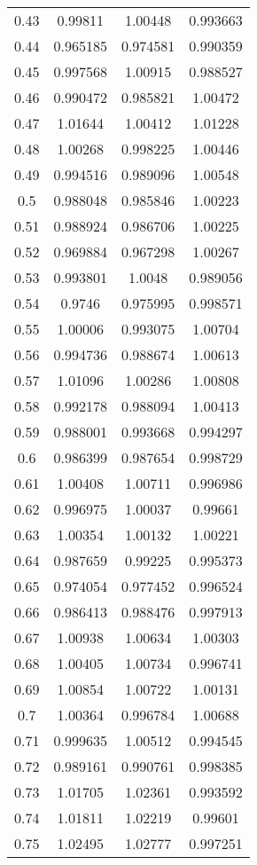 \begin{table}[h!]
\begin{tabular}{|c|c|c|c|}
0.43 & 0.99811 & 1.00448 & 0.993663 \\
0.44 & 0.965185 & 0.974581 & 0.990359 \\
0.45 & 0.997568 & 1.00915 & 0.988527 \\
0.46 & 0.990472 & 0.985821 & 1.00472 \\
0.47 & 1.01644 & 1.00412 & 1.01228 \\
0.48 & 1.00268 & 0.998225 & 1.00446 \\
0.49 & 0.994516 & 0.989096 & 1.00548 \\
0.5 & 0.988048 & 0.985846 & 1.00223 \\
0.51 & 0.988924 & 0.986706 & 1.00225 \\
0.52 & 0.969884 & 0.967298 & 1.00267 \\
0.53 & 0.993801 & 1.0048 & 0.989056 \\
0.54 & 0.9746 & 0.975995 & 0.998571 \\
0.55 & 1.00006 & 0.993075 & 1.00704 \\
0.56 & 0.994736 & 0.988674 & 1.00613 \\
0.57 & 1.01096 & 1.00286 & 1.00808 \\
0.58 & 0.992178 & 0.988094 & 1.00413 \\
0.59 & 0.988001 & 0.993668 & 0.994297 \\
0.6 & 0.986399 & 0.987654 & 0.998729 \\
0.61 & 1.00408 & 1.00711 & 0.996986 \\
0.62 & 0.996975 & 1.00037 & 0.99661 \\
0.63 & 1.00354 & 1.00132 & 1.00221 \\
0.64 & 0.987659 & 0.99225 & 0.995373 \\
0.65 & 0.974054 & 0.977452 & 0.996524 \\
0.66 & 0.986413 & 0.988476 & 0.997913 \\
0.67 & 1.00938 & 1.00634 & 1.00303 \\
0.68 & 1.00405 & 1.00734 & 0.996741 \\
0.69 & 1.00854 & 1.00722 & 1.00131 \\
0.7 & 1.00364 & 0.996784 & 1.00688 \\
0.71 & 0.999635 & 1.00512 & 0.994545 \\
0.72 & 0.989161 & 0.990761 & 0.998385 \\
0.73 & 1.01705 & 1.02361 & 0.993592 \\
0.74 & 1.01811 & 1.02219 & 0.99601 \\
0.75 & 1.02495 & 1.02777 & 0.997251 \\

\end{tabular}
\end{table}
